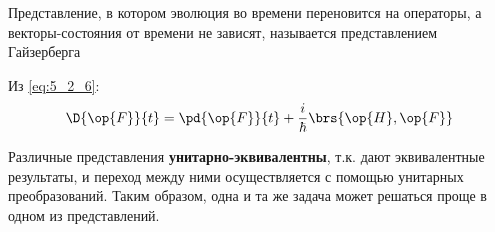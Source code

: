 \begin{defn}
Представление, в котором эволюция во времени переновится на операторы, а векторы-состояния от времени не зависят, называется представлением Гайзерберга
\end{defn}

Из \eqref{eq:5_2_6}:
$$
\D{\op{F}}{t} = \pd{\op{F}}{t} + \frac{i}{\hbar} \brs{\op{H}, \op{F}}
$$

Различные представления \textbf{унитарно-эквивалентны}, т.к. дают эквивалентные результаты, и переход между ними осуществляется с помощью унитарных преобразований. Таким образом, одна и та же задача может решаться проще в одном из представлений.
